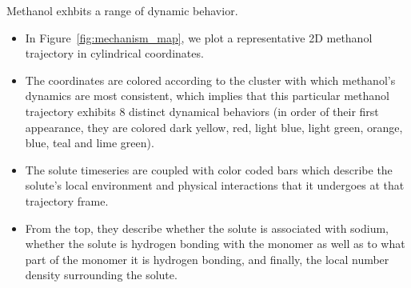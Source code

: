 \documentclass{article}
\begin{document}
  \noindent Methanol exhbits a range of dynamic behavior.
  \begin{itemize}
    \item In Figure~\ref{fig:mechanism_map}, we plot a representative 2D methanol 
    trajectory in cylindrical coordinates.
    \item The coordinates are colored according to the cluster with which methanol's
    dynamics are most consistent, which implies that this particular methanol 
    trajectory exhibits 8 distinct dynamical behaviors (in order of their first appearance,
    they are colored dark yellow, red, light blue, light green, orange, blue, teal and lime green). 
    \item The solute timeseries are coupled with color coded bars which describe the
    solute's local environment and physical interactions that it undergoes at that
    trajectory frame.
    \item From the top, they describe whether the solute is associated with sodium,
    whether the solute is hydrogen bonding with the monomer as well as to what part of
    the monomer it is hydrogen bonding, and finally, the local number density 
    surrounding the solute. 
  \end{itemize}
  
\end{document}
